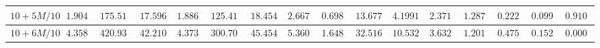 \begin{table}[]
\begin{tabular}{|c|c|c|c|c|c|c|c|c|c|c|c|c|c|c|c}
$10 + 5M/10$ & $1.904200$                                                        & $175.511800$                                                      & $17.596500$                                                         & $1.886700$                                                           & $125.412800$                                                            & $18.454700$                                                       & $2.667800$                                                          & $0.698500$                                                           & $13.677700$                                                             & $4.199100$                                                        & $2.371000$                                                          & $1.287880$                                                        & $0.222480$                                                          & $0.099940$                                                           & \multicolumn{1}{c|}{$0.910020$}                                                              \\ \hline
$10 + 6M/10$ & $4.358000$                                                        & $420.937500$                                                      & $42.210800$                                                         & $4.373200$                                                           & $300.706100$                                                            & $45.454200$                                                       & $5.360700$                                                          & $1.648500$                                                           & $32.516300$                                                             & $10.532700$                                                       & $3.632400$                                                          & $1.201130$                                                        & $0.475110$                                                          & $0.152870$                                                           & \multicolumn{1}{c|}{$0.000800$}                                                              \\ \hline

\end{tabular}
\end{table}
